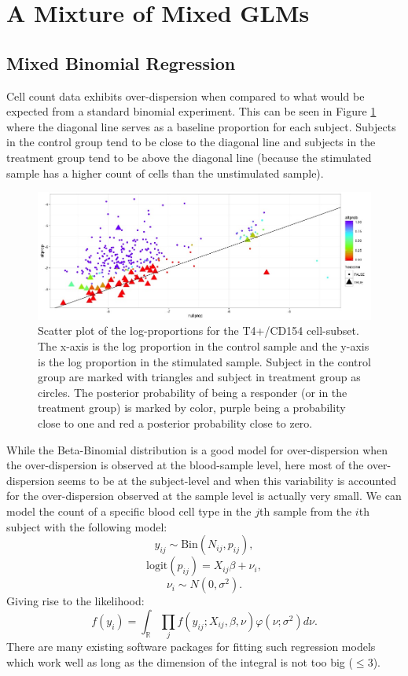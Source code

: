 \documentclass{article}\usepackage[]{graphicx}\usepackage[]{color}
\makeatletter
\def\maxwidth{ %
  \ifdim\Gin@nat@width>\linewidth
    \linewidth
  \else
    \Gin@nat@width
  \fi
}
\makeatother
\begin{document}
\section{A Mixture of Mixed GLMs}
\subsection{Mixed Binomial Regression}
Cell count data exhibits over-dispersion when compared to what would be expected from a standard binomial experiment. This can be seen in Figure \ref{CD154scatter} where the diagonal line serves as a baseline proportion for each subject. Subjects in the control group tend to be close to the diagonal line and subjects in the treatment group tend to be above the diagonal line (because the stimulated sample has a higher count of cells than the unstimulated sample).

\begin{figure}
\includegraphics[width=\maxwidth]{figures/T4CD154scatter} \caption[]{Scatter plot of the log-proportions for the T4+/CD154 cell-subset. The x-axis is the log proportion in the control sample and the y-axis is the log proportion in the stimulated sample. Subject in the control group are marked with triangles and subject in treatment group as circles. The posterior probability of being a responder (or in the treatment group) is marked by color, purple being a probability close to one and red a posterior probability close to zero.}
\label{CD154scatter}
\end{figure}

While the Beta-Binomial distribution is a good model for over-dispersion when the over-dispersion is observed at the blood-sample level, here most of the over-dispersion seems to be at the subject-level and when this variability is accounted for the over-dispersion observed at the sample level is actually very small. We can model the count of a specific blood cell type in the $j$th sample from the $i$th subject with the following model:
$$
y_{ij} \sim \text{Bin}(N_{ij}, p_{ij}),
$$$$
\text{logit}(p_{ij}) = X_{ij} \beta + \nu_{i},
$$$$
\nu_{i} \sim N(0, \sigma^{2}).
$$
Giving rise to the likelihood:
$$
f(y_{i}) = \int_{\mathbb{R}} \prod_{j} f(y_{ij} ; X_{ij}, \beta, \nu) \varphi(\nu;\sigma^{2})d\nu.
$$
There are many existing software packages for fitting such regression models which work well as long as the dimension of the integral is not too big ($\leq 3$).
\end{document}
